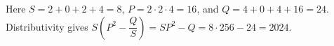 Here $S=2+0+2+4=8$, $P=2\cdot 2\cdot 4=16$, and $Q=4+0+4+16=24$. Distributivity gives $S(P^2-\dfrac{Q}{S})=SP^2-Q=8\cdot 256-24=\boxed{2024}$.

